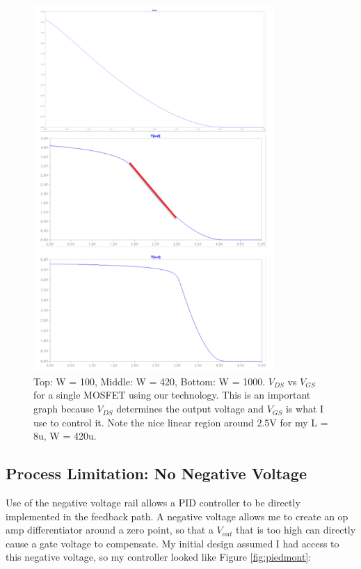 \documentclass[10pt]{amsart}
\begin{document}
\begin{figure}[h]
	\begin{center}
		\includegraphics[width=3.6in]{Media/WL.png}
	\end{center}
	\caption{Top: W = 100, Middle: W = 420, Bottom: W = 1000. $V_{DS}$ vs $V_{GS}$ for a single MOSFET using our technology. This is an important graph because $V_{DS}$ determines the output voltage and $V_{GS}$ is what I use to control it. Note the nice linear region around 2.5V for my L = 8u, W = 420u.}
	\label{fig:wl}
\end{figure}

\subsection{Process Limitation: No Negative Voltage}

Use of the negative voltage rail allows a PID controller to be directly implemented in the feedback path. A negative voltage allows me to create an op amp differentiator around a zero point, so that a $V_{out}$ that is too high can directly cause a gate voltage to compensate. My initial design assumed I had access to this negative voltage, so my controller looked like Figure \ref{fig:piedmont}: \\
\end{document}
